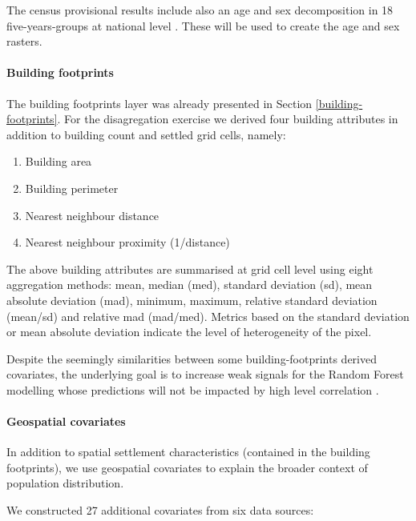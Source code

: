 \documentclass[]{book}
\providecommand{\tightlist}{%
  \setlength{\itemsep}{0pt}\setlength{\parskip}{0pt}}
\let\oldparagraph\paragraph
\renewcommand{\paragraph}[1]{\oldparagraph{#1}\mbox{}}
\begin{document}
The census provisional results include also an age and sex decomposition
in 18 five-years-groups at national level \citep{insd2019recensement}.
These will be used to create the age and sex rasters.

\paragraph{Building footprints}\label{building-footprints-1}

The building footprints layer was already presented in Section
\ref{building-footprints}. For the disagregation exercise we derived
four building attributes in addition to building count and settled grid
cells, namely:

\begin{enumerate}
\def\labelenumi{\arabic{enumi}.}
\tightlist
\item
  Building area
\item
  Building perimeter
\item
  Nearest neighbour distance
\item
  Nearest neighbour proximity (1/distance)
\end{enumerate}

The above building attributes are summarised at grid cell level using
eight aggregation methods: mean, median (med), standard deviation (sd),
mean absolute deviation (mad), minimum, maximum, relative standard
deviation (mean/sd) and relative mad (mad/med). Metrics based on the
standard deviation or mean absolute deviation indicate the level of
heterogeneity of the pixel.

Despite the seemingly similarities between some building-footprints
derived covariates, the underlying goal is to increase weak signals for
the Random Forest modelling whose predictions will not be impacted by
high level correlation \citep{genuer2010variable}.

\paragraph{Geospatial covariates}\label{geospatial-covariates-2}

In addition to spatial settlement characteristics (contained in the
building footprints), we use geospatial covariates to explain the
broader context of population distribution.

We constructed 27 additional covariates from six data sources:
\end{document}

